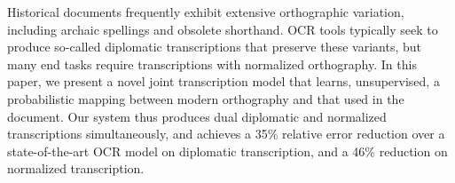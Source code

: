 Historical documents frequently exhibit extensive orthographic variation, including archaic spellings and obsolete shorthand. OCR tools typically seek to produce so-called diplomatic transcriptions that preserve these variants, but many end tasks require transcriptions with normalized orthography. In this paper, we present a novel joint transcription model that learns, unsupervised, a probabilistic mapping between modern orthography and that used in the document. Our system thus produces dual diplomatic and normalized transcriptions simultaneously, and achieves a 35\% relative error reduction over a state-of-the-art OCR model on diplomatic transcription, and a 46\% reduction on normalized transcription.
